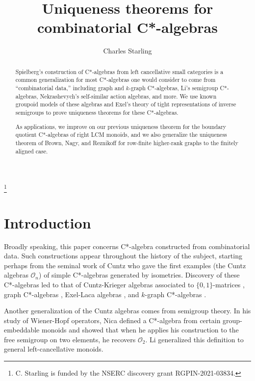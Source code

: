 \documentclass[12pt]{amsart}
\theoremstyle{definition}
\theoremstyle{remark}
\numberwithin{equation}{section}
\newcommand{\cO}{\mathcal{O}}
\begin{document}
	
	\title{Uniqueness theorems for combinatorial C*-algebras}

	
	\author{Charles Starling}
	\address[C. Starling]{Carleton University, School of Mathematics and Statistics. 4302 Herzberg Laboratories}
	
	\thanks{C. Starling is funded by the NSERC discovery grant RGPIN-2021-03834.}
	
	
	\begin{abstract}
		Spielberg's construction of C*-algebras from left cancellative small categories is a common generalization for most C*-algebras one would consider to come from ``combinatorial data,'' including graph and $k$-graph C*-algebras, Li's semigroup C*-algebras, Nekrashevych's self-similar action algebras, and more. We use known groupoid models of these algebras and Exel's theory of tight representations of inverse semigroups to prove uniqueness theorems for these C*-algebras.
		
		 As applications, we improve on our previous uniqueness theorem for the boundary quotient C*-algebras of right LCM monoids, and we also generalize the uniqueness theorem of Brown, Nagy, and Reznikoff for row-finite higher-rank graphs to the finitely aligned case. 
	\end{abstract}
	
	\maketitle
	\section{Introduction}
 Broadly speaking, this paper concerns C*-algebra constructed from combinatorial data. Such constructions appear throughout the history of the subject, starting perhaps from the seminal work of Cuntz \cite{Cu77} who gave the first examples (the Cuntz algebras $\cO_n$) of simple C*-algebras generated by isometries. Discovery of these C*-algebras led to that of Cuntz-Krieger algebras associated to $\{0,1\}$-matrices \cite{CK80}, graph C*-algebras \cite{KPR98}, Exel-Laca algebras \cite{EL99}, and $k$-graph C*-algebras \cite{KuPa00}.
 
 Another generalization of the Cuntz algebras comes from semigroup theory. In his study of Wiener-Hopf operators, Nica \cite{Ni92} defined a C*-algebra from certain group-embeddable monoids and showed that when he applies his construction to the free semigroup on two elements, he recovers $\cO_2$. Li generalized this definition \cite{Li12} to general left-cancellative monoids.
 
\end{document}

